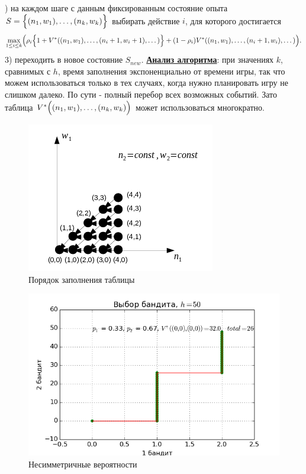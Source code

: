 \documentclass[12pt]{article}
\begin{document}
\newline
{}) на каждом шаге с данным фиксированным состояние опыта 
$S = \Bigl\{(n_1, w_1), \dots, (n_k, w_k)\Bigr \}$ выбирать действие $i$, для которого достигается
$$ \max_{1 \leq i \leq k} \Bigl(\rho_i \Bigl\{1 + V^*((n_1, w_1), \dots, (n_i + 1, w_i + 1), \dots) \Bigr\} + (1 - \rho_i)V^*((n_1, w_1), \dots, (n_i + 1, w_i), \dots)\Bigr).$$
3) переходить в новое состояние $S_{new}$.
\newline
\newline
\underline{\textbf{Анализ алгоритма}}: при значениях $k$, сравнимых с $h$, время заполнения экспоненциально от времени игры, так что можем использоваться только в тех случаях, когда нужно планировать игру не слишком далеко. По сути - полный перебор всех возможных событий. Зато таблица $V^*\Bigl((n_1, w_1), \dots, (n_k, w_k)\Bigr)$ может использоваться многократно.
\begin{figure}
  \begin{center}
  	\caption{Порядок заполнения таблицы}
    \includegraphics{short_last.png}
  \end{center}
\end{figure}
\begin{figure}
  \begin{center}
  	\caption{Несимметричные вероятности}
    \includegraphics{2bandits-pic1.png}
  \end{center}
\end{figure}
\end{document}
